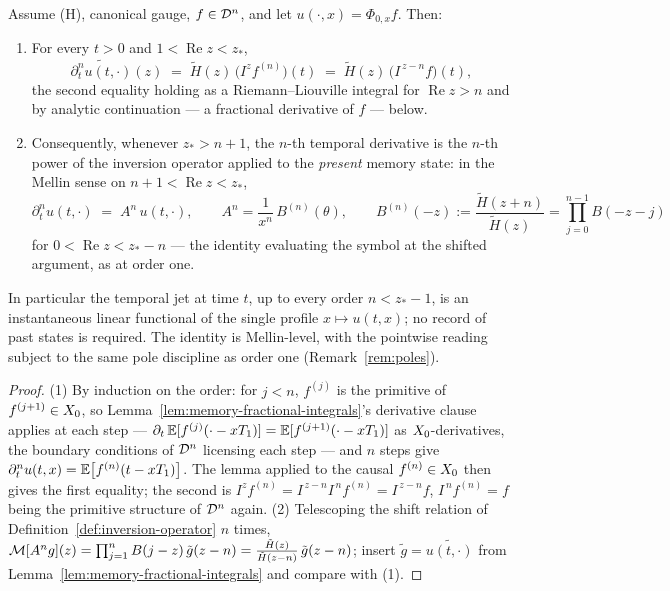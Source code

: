 \begin{theorem}\label{thm:embodied-jet}
Assume (H), canonical gauge, $f \in \mathcal{D}^n$, and let $u(\cdot, x) = \Phi_{0,x}f$. Then:
\begin{enumerate}
\item For every $t > 0$ and $1 < \operatorname{Re} z < z_*$,
\[
  \widetilde{\partial_t^n u(t, \cdot)}(z) \;=\; \tilde H(z)\,\bigl(I^{z} f^{(n)}\bigr)(t)
  \;=\; \tilde H(z)\,\bigl(I^{\,z - n} f\bigr)(t),
\]
the second equality holding as a Riemann--Liouville integral for $\operatorname{Re} z > n$ and
by analytic continuation --- a fractional derivative of $f$ --- below.
\item Consequently, whenever $z_* > n + 1$, the $n$-th temporal derivative is the $n$-th power
of the inversion operator applied to the \emph{present} memory state: in the Mellin sense on
$n + 1 < \operatorname{Re} z < z_*$,
\[
  \partial_t^n u(t, \cdot) \;=\; A^n\, u(t, \cdot), \qquad
  A^n = \frac{1}{x^n}\,B^{(n)}(\theta), \qquad
  B^{(n)}(-z) := \frac{\tilde H(z + n)}{\tilde H(z)} = \prod_{j=0}^{n-1} B(-z - j)
\]
for $0 < \operatorname{Re} z < z_* - n$ --- the identity evaluating the symbol at the shifted
argument, as at order one.
\end{enumerate}
In particular the temporal jet at time $t$, up to every order $n < z_* - 1$, is an
instantaneous linear functional of the single profile $x \mapsto u(t, x)$; no record of past
states is required. The identity is Mellin-level, with the pointwise reading subject to the
same pole discipline as order one (Remark~\ref{rem:poles}).
\end{theorem}

\begin{proof}
(1) By induction on the order: for $j < n$, $f^{(j)}$ is the primitive of
$f^{(j+1)} \in X_0$, so Lemma~\ref{lem:memory-fractional-integrals}'s derivative clause
applies at each step --- $\partial_t\,\mathbb{E}[f^{(j)}(\cdot - xT_1)] = \mathbb{E}[f^{(j+1)}(\cdot - xT_1)]$
as $X_0$-derivatives, the boundary conditions of $\mathcal{D}^n$ licensing each step --- and $n$
steps give $\partial_t^n u(t, x) = \mathbb{E}\bigl[f^{(n)}(t - x T_1)\bigr]$. The lemma applied to
the causal $f^{(n)} \in X_0$ then gives the
first equality; the second is $I^{z} f^{(n)} = I^{\,z-n} I^{\,n} f^{(n)} = I^{\,z-n} f$,
$I^{\,n}f^{(n)} = f$ being the primitive structure of $\mathcal{D}^n$ again. (2) Telescoping the shift relation of
Definition~\ref{def:inversion-operator} $n$ times,
$\mathcal{M}[A^n g](z) = \prod_{j=1}^{n} B(j - z)\,\tilde g(z - n)
= \tfrac{\tilde H(z)}{\tilde H(z - n)}\,\tilde g(z - n)$; insert
$\tilde g = \widetilde{u(t,\cdot)}$ from Lemma~\ref{lem:memory-fractional-integrals} and
compare with (1).
\end{proof}

